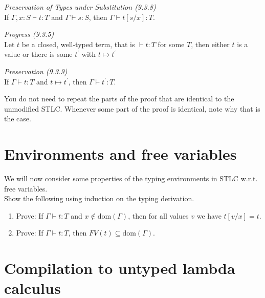 \begin{theorem}\emph{Preservation of Types under Substitution (9.3.8)}\\
  If $\Gamma, x:S\vdash t:T$ and $\Gamma \vdash s:S$, then $\Gamma \vdash t[s/x]:T$.
\end{theorem}
\begin{theorem}\emph{Progress (9.3.5)}\\
  Let $t$ be a closed, well-typed term, that is $\vdash t:T$ for some $T$, then either $t$ is a value or there is some $t^{\prime}$ with $t\mapsto t^{\prime}$
\end{theorem}
\begin{theorem}\emph{Preservation (9.3.9)}\\
  If $\Gamma\vdash t:T$ and $t\mapsto t^{\prime}$, then $\Gamma \vdash t^{\prime}:T$.
\end{theorem}
You do not need to repeat the parts of the proof that are identical to the unmodified STLC.
Whenever some part of the proof is identical, note why that is the case.

\section{Environments and free variables}
We will now consider some properties of the typing environments in STLC w.r.t. free variables.\\
Show the following using induction on the typing derivation.
\begin{enumerate}
  \item Prove: If $\Gamma \vdash t : T$ and $x \notin \mathrm{dom}(\Gamma)$, then for all values $v$ we have $t[v/x] = t$.
  \item Prove: If $\Gamma \vdash t : T$, then $FV(t) \subseteq \mathrm{dom}(\Gamma)$.
\end{enumerate}

\section{Compilation to untyped lambda calculus}

